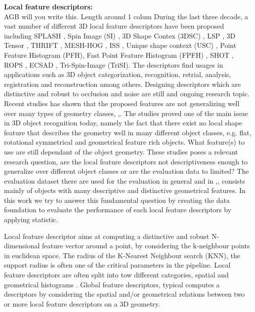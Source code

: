 \documentclass[10pt,twocolumn,letterpaper]{article}
\begin{document}
\textbf{Local feature descriptors:}\\
{\color{red} AGB will you write this. Length around 1 colum}
During the last three decade, a vast number of different 3D local feature descriptors have been proposed including SPLASH \cite{Stein1992}, Spin Image (SI) \cite{Johnson1999}, 3D Shape Contex (3DSC) \cite{Frome2004}, LSP \cite{ChenBhanu2004}, 3D Tensor \cite{Mian2006}, THRIFT \cite{Flint2007}, MESH-HOG \cite{Zaharescu2009}, ISS \cite{Zhong2009}, Unique shape context (USC) \cite{usc2010}, Point Feature Histogram (PFH)\cite{Rusu2008}, Fast Point Feature Histogram (FPFH) \cite{Fpfh2009}, SHOT \cite{Tombari2010}, ROPS \cite{Guo2013}, ECSAD \cite{Ecsad2015}, Tri-Spin-Image (TriSI)\cite{Guo2015}. The descriptors find usages in applications such as 3D object categorization, recognition, retrial, analysis, registration and reconstruction among others. Designing descriptors which are distinctive and robust to occlusion and noise are still and ongoing research topic. Recent studies has shown that the proposed features are not generalizing well over many types of geometry classes, \cite{Guo2015},\cite{Buch2016}. The studies proved one of the main issue in 3D object recognition today, namely the fact that there exist no local shape feature that describes the geometry well in many different object classes, e.g. flat, rotational symmetrical and geometrical feature rich objects. What feature(s) to use are still dependant of the object geometry. These studies poses a relevant research question, are the local feature descriptors not descriptiveness enough to generalize over different object classes or are the evaluation data to limited? The evaluation dataset there are used for the evaluation in general and in \cite{Guo2015},\cite{Buch2016}, consists mainly of objects with many descriptive and distinctive geometrical features. In this work we try to answer this fundamental question by creating the data foundation to evaluate the performance of each local feature descriptors by applying statistic. 

Local feature descriptor aims at computing a distinctive and robust N-dimensional feature vector around a point, by considering the k-neighbour points in euclidean space. The radius of the K-Nearest Neighbour search (KNN), the support radius is often one of the critical parameters in the pipeline. Local feature descriptors are often split into tow different categories, spatial and geometrical histograms \cite{Guo2015}. Global feature descriptors, typical computes a descriptors by considering the spatial and/or geometrical relations between two or more local feature descriptors on a 3D geometry.   
\end{document}
